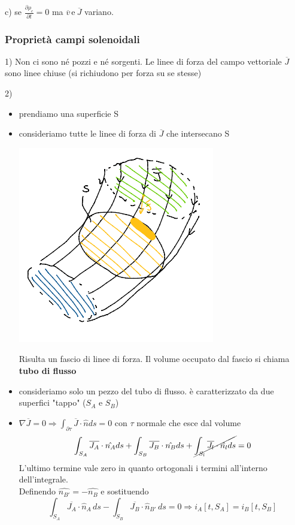 c) se $\frac{\partial \rho_c}{\partial t} = 0$ ma $\overline{v} \,\text{e}\ \overline{J}$ variano.
\subsubsection{Proprietà campi solenoidali}
1) Non ci sono né pozzi e né sorgenti. Le linee di forza del campo vettoriale $\overline{J}$ sono linee chiuse (si richiudono per forza su se stesse)

2) \begin{itemize}
    \item prendiamo una superficie S
    \item consideriamo tutte le linee di forza di $\overline{J}$ che intersecano S
    \begin{center}
        \includegraphics[scale=0.7]{immagini/image7.png}
    \end{center}

    Risulta un fascio di linee di forza. Il volume occupato dal fascio si chiama \textbf{tubo di flusso}
    \item consideriamo solo un pezzo del tubo di flusso. è caratterizzato da due superfici "tappo" ($S_A$ e $S_B$)
    \item $\nabla \overline{J} = 0 \Rightarrow \int_{\partial \tau}\overline{J}\cdot\hat{n}ds = 0$ con $\tau$ normale che esce dal volume\\
    \[\int_{S_A}\overline{J_A}\cdot\hat{n_A}ds + \int_{S_B}\overline{J_B}\cdot\hat{n_B}ds + \cancel{\int_{S_l}\overline{J_l}\cdot\hat{n_l}ds} = 0\]
    L'ultimo termine vale zero in quanto ortogonali i termini all'interno dell'integrale.\\
    Definendo $\hat{n_{B'}} = -\hat{n_B}$ e sostituendo
    \[
        \int_{S_A} \overline{J_A} \cdot \hat{n}_A \, ds - \int_{S_B} \overline{J_B} \cdot \hat{n}_{B'} \, ds = 0 \Rightarrow i_A[t, S_A] = i_B[t,S_B]
    \]
    \end{itemize}
